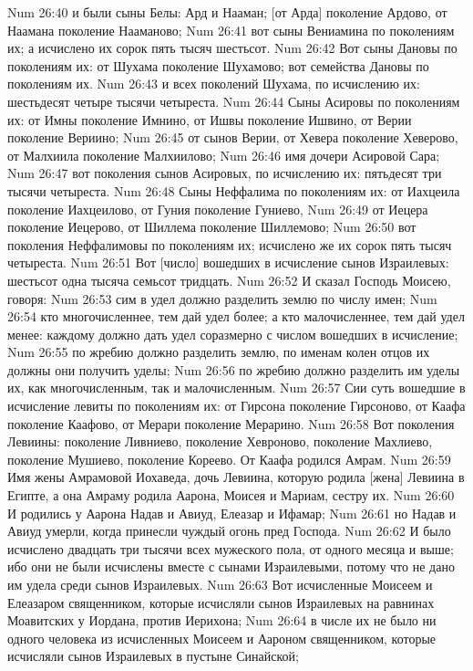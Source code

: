 Num 26:40  и были сыны Белы: Ард и Нааман; [от Арда] поколение Ардово, от Наамана поколение Нааманово;
Num 26:41  вот сыны Вениамина по поколениям их; а исчислено их сорок пять тысяч шестьсот.
Num 26:42  Вот сыны Дановы по поколениям их: от Шухама поколение Шухамово; вот семейства Дановы по поколениям их.
Num 26:43  и всех поколений Шухама, по исчислению их: шестьдесят четыре тысячи четыреста.
Num 26:44  Сыны Асировы по поколениям их: от Имны поколение Имнино, от Ишвы поколение Ишвино, от Верии поколение Вериино;
Num 26:45  от сынов Верии, от Хевера поколение Хеверово, от Малхиила поколение Малхиилово;
Num 26:46  имя дочери Асировой Сара;
Num 26:47  вот поколения сынов Асировых, по исчислению их: пятьдесят три тысячи четыреста.
Num 26:48  Сыны Неффалима по поколениям их: от Иахцеила поколение Иахцеилово, от Гуния поколение Гуниево,
Num 26:49  от Иецера поколение Иецерово, от Шиллема поколение Шиллемово;
Num 26:50  вот поколения Неффалимовы по поколениям их; исчислено же их сорок пять тысяч четыреста.
Num 26:51  Вот [число] вошедших в исчисление сынов Израилевых: шестьсот одна тысяча семьсот тридцать.
Num 26:52  И сказал Господь Моисею, говоря:
Num 26:53  сим в удел должно разделить землю по числу имен;
Num 26:54  кто многочисленнее, тем дай удел более; а кто малочисленнее, тем дай удел менее: каждому должно дать удел соразмерно с числом вошедших в исчисление;
Num 26:55  по жребию должно разделить землю, по именам колен отцов их должны они получить уделы;
Num 26:56  по жребию должно разделить им уделы их, как многочисленным, так и малочисленным.
Num 26:57  Сии суть вошедшие в исчисление левиты по поколениям их: от Гирсона поколение Гирсоново, от Каафа поколение Каафово, от Мерари поколение Мерарино.
Num 26:58  Вот поколения Левиины: поколение Ливниево, поколение Хевроново, поколение Махлиево, поколение Мушиево, поколение Кореево. От Каафа родился Амрам.
Num 26:59  Имя жены Амрамовой Иохаведа, дочь Левиина, которую родила [жена] Левиина в Египте, а она Амраму родила Аарона, Моисея и Мариам, сестру их.
Num 26:60  И родились у Аарона Надав и Авиуд, Елеазар и Ифамар;
Num 26:61  но Надав и Авиуд умерли, когда принесли чуждый огонь пред Господа.
Num 26:62  И было исчислено двадцать три тысячи всех мужеского пола, от одного месяца и выше; ибо они не были исчислены вместе с сынами Израилевыми, потому что не дано им удела среди сынов Израилевых.
Num 26:63  Вот исчисленные Моисеем и Елеазаром священником, которые исчисляли сынов Израилевых на равнинах Моавитских у Иордана, против Иерихона;
Num 26:64  в числе их не было ни одного человека из исчисленных Моисеем и Аароном священником, которые исчисляли сынов Израилевых в пустыне Синайской;
